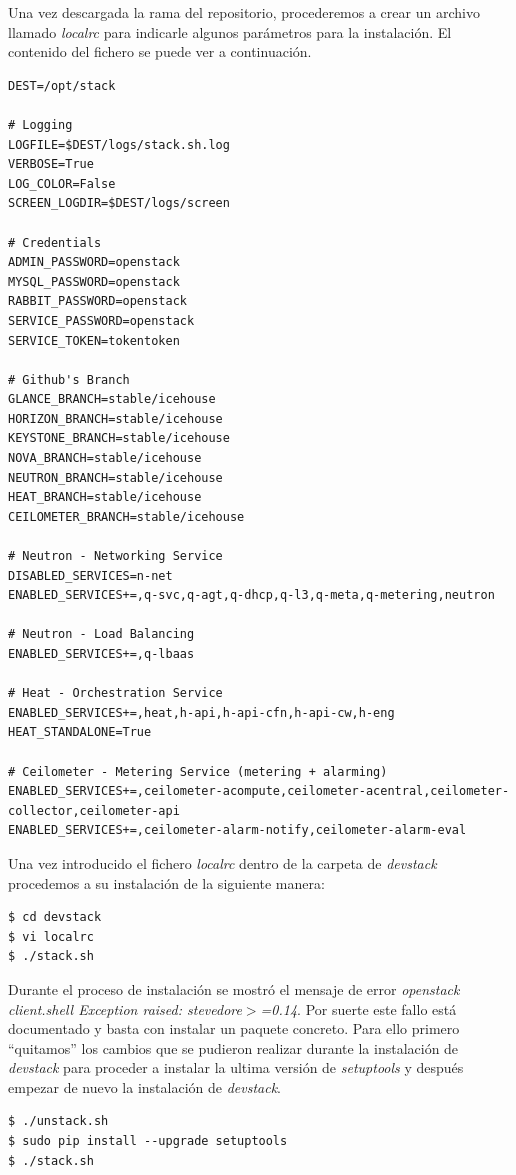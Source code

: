 \documentclass{article}
\begin{document}
	Una vez descargada la rama del repositorio, procederemos a crear un archivo llamado \emph{localrc} para indicarle algunos parámetros para la instalación\cite{DevstackLocalrc, NeutronDevstack, DevstackLocalrcGithub, NeutronGithubDevstack}. El contenido del fichero se puede ver a continuación.

\begin{lstlisting}[style=miniBash]
DEST=/opt/stack

# Logging
LOGFILE=$DEST/logs/stack.sh.log
VERBOSE=True
LOG_COLOR=False
SCREEN_LOGDIR=$DEST/logs/screen

# Credentials
ADMIN_PASSWORD=openstack
MYSQL_PASSWORD=openstack
RABBIT_PASSWORD=openstack
SERVICE_PASSWORD=openstack
SERVICE_TOKEN=tokentoken

# Github's Branch
GLANCE_BRANCH=stable/icehouse
HORIZON_BRANCH=stable/icehouse
KEYSTONE_BRANCH=stable/icehouse
NOVA_BRANCH=stable/icehouse
NEUTRON_BRANCH=stable/icehouse
HEAT_BRANCH=stable/icehouse
CEILOMETER_BRANCH=stable/icehouse

# Neutron - Networking Service
DISABLED_SERVICES=n-net
ENABLED_SERVICES+=,q-svc,q-agt,q-dhcp,q-l3,q-meta,q-metering,neutron

# Neutron - Load Balancing
ENABLED_SERVICES+=,q-lbaas

# Heat - Orchestration Service
ENABLED_SERVICES+=,heat,h-api,h-api-cfn,h-api-cw,h-eng
HEAT_STANDALONE=True

# Ceilometer - Metering Service (metering + alarming)
ENABLED_SERVICES+=,ceilometer-acompute,ceilometer-acentral,ceilometer-collector,ceilometer-api
ENABLED_SERVICES+=,ceilometer-alarm-notify,ceilometer-alarm-eval
\end{lstlisting}	
	
	Una vez introducido el fichero \emph{localrc} dentro de la carpeta de \emph{devstack} procedemos a su instalación de la siguiente manera:
\begin{lstlisting}[style=miniBash]
$ cd devstack
$ vi localrc
$ ./stack.sh	
\end{lstlisting}	

	Durante el proceso de instalación se mostró el mensaje de error \emph{openstack client.shell Exception raised: stevedore$>$=0.14}. Por suerte este fallo está documentado y basta con instalar un paquete concreto\cite{setuptools}. Para ello primero ``quitamos'' los cambios que se pudieron realizar durante la instalación de \emph{devstack} para proceder a instalar la ultima versión de \emph{setuptools} y después empezar de nuevo la instalación de \emph{devstack}.
\begin{lstlisting}[style=miniBash]
$ ./unstack.sh
$ sudo pip install --upgrade setuptools
$ ./stack.sh	
\end{lstlisting}
\end{document}
